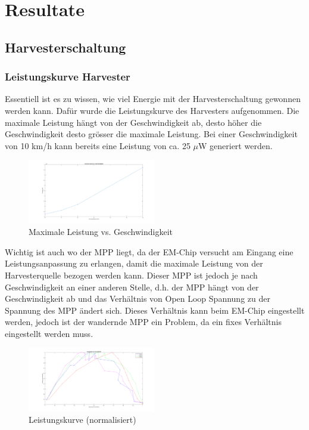\chapter{Resultate}

\section{Harvesterschaltung}

\subsection{Leistungskurve Harvester}

Essentiell ist es zu wissen, wie viel Energie mit der Harvesterschaltung gewonnen werden kann. Dafür wurde die Leistungskurve des Harvesters aufgenommen. Die maximale Leistung hängt von der Geschwindigkeit ab, desto höher die Geschwindigkeit desto grösser die maximale Leistung. Bei einer Geschwindigkeit von 10 km/h kann bereits eine Leistung von ca. 25 $\mu$W generiert werden.

\begin{figure}[ht]
\includegraphics[width=0.5\textwidth]{4Resultate/imag/ResultatLeistungGeschwindigkeit.png} 
\caption{Maximale Leistung vs. Geschwindigkeit}
\end{figure}

Wichtig ist auch wo der MPP liegt, da der EM-Chip versucht am Eingang eine Leistungsanpassung zu erlangen, damit die maximale Leistung von der Harvesterquelle bezogen werden kann. Dieser MPP ist jedoch je nach Geschwindigkeit an einer anderen Stelle, d.h. der MPP hängt von der Geschwindigkeit ab und das Verhältnis von Open Loop Spannung zu der Spannung des MPP ändert sich. Dieses Verhältnis kann beim EM-Chip eingestellt werden, jedoch ist der wandernde MPP ein Problem, da ein fixes Verhältnis eingestellt werden muss.

\begin{figure}[ht]
\includegraphics[width=0.5\textwidth]{4Resultate/imag/MPPHarvester.png} 
\caption{Leistungskurve (normalisiert) }
\end{figure}


